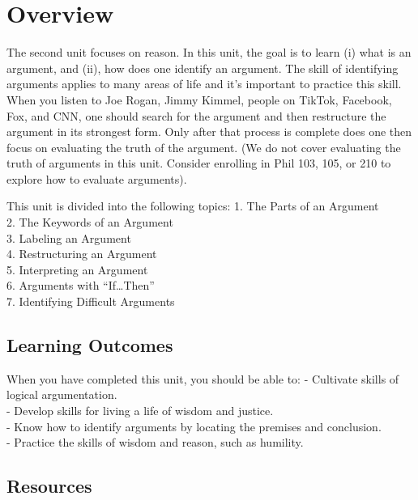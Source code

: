 \documentclass[
]{book}
\begin{document}
\hypertarget{overview-1}{%
\section{Overview}\label{overview-1}}

The second unit focuses on reason. In this unit, the goal is to learn (i) what is an argument, and (ii), how does one identify an argument. The skill of identifying arguments applies to many areas of life and it's important to practice this skill. When you listen to Joe Rogan, Jimmy Kimmel, people on TikTok, Facebook, Fox, and CNN, one should search for the argument and then restructure the argument in its strongest form. Only after that process is complete does one then focus on evaluating the truth of the argument. (We do not cover evaluating the truth of arguments in this unit. Consider enrolling in Phil 103, 105, or 210 to explore how to evaluate arguments).

This unit is divided into the following topics:
1. The Parts of an Argument\\
2. The Keywords of an Argument\\
3. Labeling an Argument\\
4. Restructuring an Argument\\
5. Interpreting an Argument\\
6. Arguments with ``If\ldots Then''\\
7. Identifying Difficult Arguments

\hypertarget{learning-outcomes-1}{%
\subsection*{Learning Outcomes}\label{learning-outcomes-1}}

When you have completed this unit, you should be able to:
- Cultivate skills of logical argumentation.\\
- Develop skills for living a life of wisdom and justice.\\
- Know how to identify arguments by locating the premises and conclusion.\\
- Practice the skills of wisdom and reason, such as humility.

\hypertarget{resources-1}{%
\subsection*{Resources}\label{resources-1}}
\end{document}
